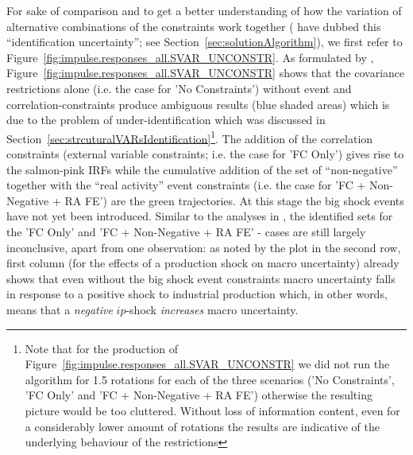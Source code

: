 \documentclass[a4paper,11pt,listof=nochaptergap,oneside,pointednumbers,bibtotoc,bigheadings,liststotoc,hidelinks]{scrbook}
\theoremstyle{mysatz}
\theoremstyle{mydefinition}
\theoremstyle{mytheorem}
\theoremstyle{mybemerkung}
\begin{document}
For sake of comparison and to get a better understanding of how the variation of alternative combinations of the constraints work together (\citet{ludvigsonetal:19} have dubbed this ``identification uncertainty''; see Section~\ref{sec:solutionAlgorithm}), we first refer to Figure~\ref{fig:impulse.responses_all.SVAR_UNCONSTR}. As formulated by \citet{ludvigsonetal:19}, Figure~\ref{fig:impulse.responses_all.SVAR_UNCONSTR} shows that the covariance restrictions alone (i.e. the case for 'No Constraints') without event and correlation-constraints produce ambiguous results (blue shaded areas) which is due to the problem of under-identification which was discussed in Section~\ref{sec:strcuturalVARsIdentification}\footnote{Note that for the production of Figure~\ref{fig:impulse.responses_all.SVAR_UNCONSTR} we did not run the algorithm for 1.5 rotations for each of the three scenarios ('No Constraints', 'FC Only' and 'FC + Non-Negative + RA FE') otherwise the resulting picture would be too cluttered. Without loss of information content, even for a considerably lower amount of rotations the results are indicative of the underlying behaviour of the restrictions}. The addition of the correlation constraints (external variable constraints; i.e. the case for 'FC Only') gives rise to the salmon-pink IRFs while the cumulative addition of the set of ``non-negative'' together with the ``real activity'' event constraints (i.e. the case for 'FC + Non-Negative + RA FE') are the green trajectories. At this stage the big shock events have not yet been introduced. Similar to the analyses in \citet{ludvigsonetal:19}, the identified sets for the 'FC Only' and 'FC + Non-Negative + RA FE' - cases are still largely inconclusive, apart from one observation: as noted by \citet{ludvigsonetal:19} the plot in the second row, first column (for the effects of a production shock on macro uncertainty) already shows that even without the big shock event constraints macro uncertainty falls in response to a positive shock to industrial production which, in other words, means that a \textit{negative} $ip$-shock \textit{increases} macro uncertainty.
\end{document}
